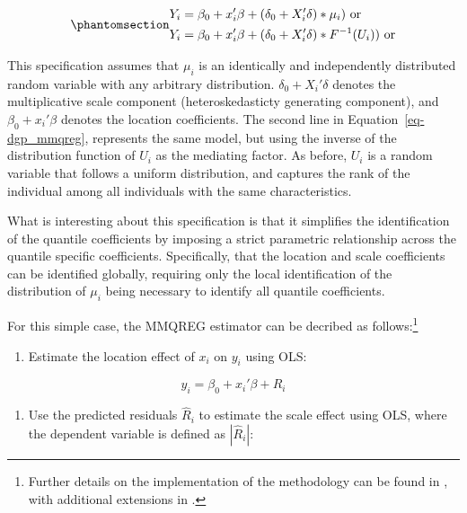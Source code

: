 \documentclass[bib]{statapress}
\providecommand{\tightlist}{%
  \setlength{\itemsep}{0pt}\setlength{\parskip}{0pt}}\usepackage{longtable,booktabs,array}
\begin{document}
\begin{equation}\phantomsection\label{eq-dgp_mmqreg}{\begin{aligned}
Y_{i} &= \beta_0 + x_{i}' \beta + (\delta_0 + X_{i}' \delta)*\mu_i) \text{ or} \\
Y_{i} &= \beta_0 + x_{i}' \beta + (\delta_0 + X_{i}' \delta)*F^{-1}(U_i)) \text{ or} 
\end{aligned}
}\end{equation}

This specification assumes that \(\mu_i\) is an identically and
independently distributed random variable with any arbitrary
distribution. \(\delta_0 + X_{i}' \delta\) denotes the multiplicative
scale component (heteroskedasticty generating component), and
\(\beta_0 + x_{i}' \beta\) denotes the location coefficients. The second
line in Equation~\ref{eq-dgp_mmqreg}, represents the same model, but
using the inverse of the distribution function of \(U_i\) as the
mediating factor. As before, \(U_i\) is a random variable that follows a
uniform distribution, and captures the rank of the individual among all
individuals with the same characteristics.

What is interesting about this specification is that it simplifies the
identification of the quantile coefficients by imposing a strict
parametric relationship across the quantile specific coefficients.
Specifically, that the location and scale coefficients can be identified
globally, requiring only the local identification of the distribution of
\(\mu_i\) being necessary to identify all quantile coefficients.

For this simple case, the MMQREG estimator can be decribed as
follows:\footnote{Further details on the implementation of the
  methodology can be found in \citet{mss2019}, with additional
  extensions in \citet{riosavila2024}.}

\begin{enumerate}
\def\labelenumi{\arabic{enumi}.}
\tightlist
\item
  Estimate the location effect of \(x_{i}\) on \(y_{i}\) using OLS:
\end{enumerate}

\[y_{i} = \beta_0 + x_{i}' \beta + R_i\]

\begin{enumerate}
\def\labelenumi{\arabic{enumi}.}
\setcounter{enumi}{1}
\tightlist
\item
  Use the predicted residuals \(\hat R_i\) to estimate the scale effect
  using OLS, where the dependent variable is defined as \(|\hat R_i|\):
\end{enumerate}
\end{document}
